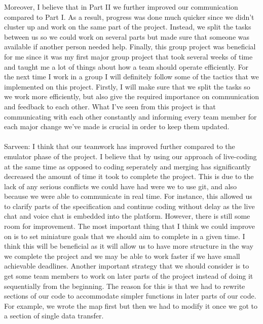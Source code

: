 \documentclass[a4paper]{article}
\begin{document}
Moreover, I believe that in Part II we further improved our communication compared to Part I. As a result, progress was
done much quicker since we didn't cluster up and work on the same part of the project. Instead, we split the tasks between us so we could
work on several parts but made sure that someone was available if another person needed help. Finally, this group project was beneficial 
for me since it was my first major group project that took several weeks of time and taught me a lot of things about how a team should 
operate efficiently. For the next time I work in a group I will definitely follow some of the tactics that we implemented on this project.
Firstly, I will make sure that we split the tasks so we work more efficiently, but also give the required importance on communication and
feedback to each other. What I've seen from this project is that communicating with each other constantly and informing every team member
for each major change we've made is crucial in order to keep them updated.
\\ \\
Sarveen: I think that our teamwork has improved further compared to the emulator phase of the project. I believe that
by using our approach of live-coding at the same time as opposed to coding seperately and merging has significantly
decreased the amount of time it took to complete the project. This is due to the lack of any serious conflicts we could
have had were we to use git, and also because we were able to communicate in real time. For instance, this allowed us 
to clarify parts of the specification and continue coding without delay as the live chat and voice chat is embedded
into the platform. However, there is still some room for improvement. The most important thing that I think we could 
improve on is to set miniature goals that we should aim to complete in a given time. I think this will be beneficial 
as it will allow us to have more structure in the way we complete the project and we may be able to work faster if we
have small achievable deadlines. Another important strategy that we should consider is to get some team members to work
on later parts of the project instead of doing it sequentially from the beginning. The reason for this is that we had 
to rewrite sections of our code to accommodate simpler functions in later parts of our code. For example, we wrote the 
map first but then we had to modify it once we got to a section of single data transfer. 

\bigskip
\bigskip
\end{document}
